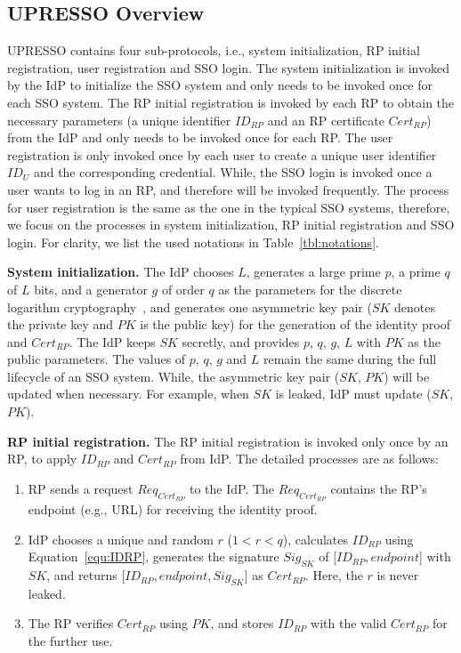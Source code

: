 \subsection{UPRESSO Overview}
\label{implementations}
UPRESSO contains four sub-protocols, i.e., system initialization, RP initial registration, user registration and SSO login.
The system initialization is invoked by the IdP to initialize the SSO system and only needs to be invoked once for each SSO system.
The RP initial registration is invoked by each RP to obtain the necessary parameters (a unique identifier $ID_{RP}$ and an RP certificate $Cert_{RP}$) from the IdP and only needs to be invoked once for each RP.
The user registration is only invoked once by each user to create a unique user identifier $ID_U$ and the corresponding credential.
While, the SSO login is invoked once a user wants to log in an RP, and therefore will be invoked frequently.
The process for user registration is the same as the one in the typical SSO systems,
therefore, we focus on the processes in  system initialization, RP initial registration and SSO login.
For clarity, we list the used notations  in Table~\ref{tbl:notations}.

\vspace{1mm}\noindent \textbf{System initialization.} The IdP chooses $L$, generates a large prime $p$, a prime $q$ of $L$ bits, and a generator $g$ of order $q$ as  the parameters for the discrete logarithm cryptography~\cite{gallagher2013digital}, and generates one asymmetric key pair ($SK$ denotes the private key and $PK$ is the public key) for the generation of the identity proof and $Cert_{RP}$.
The IdP keeps $SK$ secretly, and provides $p$, $q$, $g$, $L$ with $PK$ as the public parameters.
The values of $p$, $q$, $g$ and $L$ remain the same during the full lifecycle of an SSO system.
While, the asymmetric key pair ($SK$, $PK$) will be updated when necessary. For example, when $SK$ is leaked, IdP must update ($SK$,$PK$).

\vspace{1mm}\noindent\textbf{RP initial registration.}
The RP initial registration is invoked only once by an RP, to apply $ID_{RP}$ and $Cert_{RP}$ from IdP.
The detailed processes are as follows:
\begin{enumerate}
\item RP sends a request $Req_{Cert_{RP}}$ to the IdP. The $Req_{Cert_{RP}}$ contains the RP's endpoint (e.g., URL) for receiving the identity proof.
\item IdP chooses a unique and random $r$ ($1 < r < q$),  calculates $ID_{RP}$ using Equation~\ref{equ:IDRP},  generates the signature $Sig_{SK}$ of [$ID_{RP}, endpoint$] with $SK$, and returns [$ID_{RP}, endpoint, Sig_{SK}$] as $Cert_{RP}$. Here, the $r$ is never leaked.
\item The RP  verifies $Cert_{RP}$ using $PK$,  and stores $ID_{RP}$ with the valid $Cert_{RP}$ for the further use.
\end{enumerate}

